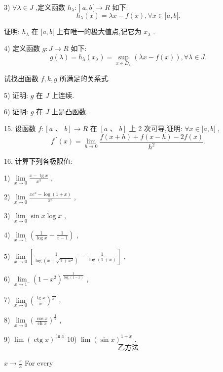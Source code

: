 3) $\forall \lambda  \in  J$ ,定义函数 $\left. {{h}_{\lambda } : }\right\rbrack  a,b\lbrack  \rightarrow  R$ 如下:
$${h}_{\lambda }\left( x\right)  = {\lambda x} - f\left( x\right) ,\forall x \in  \rbrack a,b\lbrack .$$

证明: ${h}_{\lambda }$ 在 $\rbrack a,b\lbrack$ 上有唯一的极大值点,记它为 ${x}_{\lambda }$ .

4) 定义函数 $g : J \rightarrow  R$ 如下:
$$g\left( \lambda \right)  = {h}_{\lambda }\left( {x}_{\lambda }\right)  = \mathop{\sup }\limits_{{x \in  {D}_{\lambda }}}\left( {{\lambda x} - f\left( x\right) }\right) ,\forall \lambda  \in  J.$$

试找出函数 $f,k,g$ 所满足的关系式.

5) 证明: $g$ 在 $J$ 上连续.

6) 证明: $g$ 在 $J$ 上是凸函数.

15. 设函数 $f : \left\lbrack  {a\text{ 、 }b}\right\rbrack   \rightarrow  R$ 在 $\left\lbrack  {a\text{ 、 }b}\right\rbrack$ 上 2 次可导,证明: $\forall x \in  \rbrack a,b\lbrack$ ,
$${f}^{\prime \prime }\left( x\right)  = \mathop{\lim }\limits_{{h \rightarrow  0}}\frac{f\left( {x + h}\right)  + f\left( {x - h}\right)  - {2f}\left( x\right) }{{h}^{2}}.$$

16. 计算下列各极限值:

1) $\mathop{\lim }\limits_{{x \rightarrow  0}}\frac{x - \operatorname{tg}x}{{x}^{3}}$ ,

2) $\mathop{\lim }\limits_{{x \rightarrow  0}}\frac{x{e}^{x} - \log \left( {1 + x}\right) }{{x}^{2}}$ ,

3) $\mathop{\lim }\limits_{{x \rightarrow  0}}\sin x\log x$ ,

4) $\mathop{\lim }\limits_{{x \rightarrow  1}}\left( {\frac{1}{\log x} - \frac{1}{x - 1}}\right)$ ,

5) $\mathop{\lim }\limits_{{x \rightarrow  0}}\left\lbrack  {\frac{1}{\log \left( {x + \sqrt{1 + {x}^{2}}}\right) } - \frac{1}{\log \left( {1 + x}\right) }}\right\rbrack$ ,

6) $\mathop{\lim }\limits_{{x \rightarrow  {1}^{ - }}}{\left( 1 - {x}^{2}\right) }^{\frac{1}{\log \left( {1 - x}\right) }}$ ,

7) $\mathop{\lim }\limits_{{x \rightarrow  0}}{\left( \frac{\operatorname{tg}x}{x}\right) }^{\frac{1}{{x}^{2}}}$ ,

8) $\mathop{\lim }\limits_{{x \rightarrow  0}}{\left( \frac{\cos x}{\operatorname{ch}x}\right) }^{\frac{1}{2}}$ ,

9) $\lim {\left( \operatorname{ctg}x\right) }^{\ln x}$ 10) $\lim {\left( \sin x\right) }^{1 + x}$ .
$$\text{ 乙方法 }$$

$x \rightarrow  \frac{\pi }{3}$ For every

